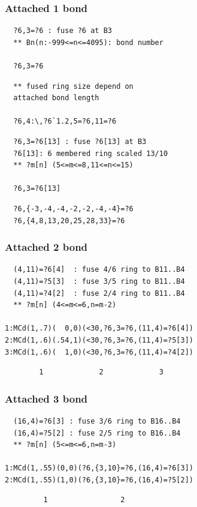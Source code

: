 \documentclass[a4paper]{article}
\makeatletter
\def\MCFstructure{\hspace{5mm}{\@strufont\char\fontnum}\advance\fontnum\@ne\relax}%
\makeatother
\begin{document}
\subsubsection{Attached 1 bond}
\begin{verbatim}
  ?6,3=?6 : fuse ?6 at B3
  ** Bn(n:-999<=n<=4095): bond number

  ?6,3=?6
\end{verbatim}
\MCFstructure
\begin{verbatim}
  ** fused ring size depend on 
  attached bond length

  ?6,4:\,?6`1.2,5=?6,11=?6
\end{verbatim}
\MCFstructure
\begin{verbatim}
  ?6,3=?6[13] : fuse ?6[13] at B3
  ?6[13]: 6 membered ring scaled 13/10
  ** ?m[n] (5<=m<=8,11<=n<=15)

  ?6,3=?6[13]
\end{verbatim}
\MCFstructure
\begin{verbatim}
  ?6,{-3,-4,-4,-2,-2,-4,-4}=?6
  ?6,{4,8,13,20,25,28,33}=?6
\end{verbatim}
\MCFstructure
\subsubsection{Attached 2 bond}
\begin{verbatim}
  (4,11)=?6[4]  : fuse 4/6 ring to B11..B4
  (4,11)=?5[3]  : fuse 3/5 ring to B11..B4
  (4,11)=?4[2]  : fuse 2/4 ring to B11..B4
  ** ?m[n] (4<=m<=6,n=m-2)

1:MCd(1,.7)(  0,0)(<30,?6,3=?6,(11,4)=?6[4])
2:MCd(1,.6)(.54,1)(<30,?6,3=?6,(11,4)=?5[3])
3:MCd(1,.6)(  1,0)(<30,?6,3=?6,(11,4)=?4[2])
\end{verbatim}
\MCFstructure
\vspace{-3mm}%
\begin{verbatim}
        1             2             3
\end{verbatim}
\subsubsection{Attached 3 bond}
\begin{verbatim}
  (16,4)=?6[3] : fuse 3/6 ring to B16..B4
  (16,4)=?5[2] : fuse 2/5 ring to B16..B4
  ** ?m[n] (5<=m<=6,n=m-3)

1:MCd(1,.55)(0,0)(?6,{3,10}=?6,(16,4)=?6[3])
2:MCd(1,.55)(1,0)(?6,{3,10}=?6,(16,4)=?5[2])
\end{verbatim}
\MCFstructure
\vspace{-3mm}%
\begin{verbatim}
         1                 2
\end{verbatim}
\end{document}
